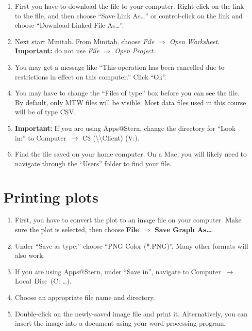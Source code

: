 \documentclass[11pt]{article}
\begin{document}
\begin{enumerate}

\item First you have to download the file to your computer.  
Right-click on the link to the file, and then choose ``Save Link As\ldots'' or
control-click on the link and choose ``Download Linked File As\ldots''.

\item Next start Minitab.  From Minitab, choose \textit{File $\Rightarrow$
  Open Worksheet}.  \textbf{Important:} do not use \textit{File $\Rightarrow$
  Open Project}.

\item You may get a message like ``This operation has been cancelled due to
  restrictions in effect on this computer.''  Click ``Ok''.

\item You may have to change the ``Files of type'' box before you can see the
file.  By default, only MTW files will be visible. Most data files used in this
course will be of type CSV.

\item \textbf{Important:} If you are using Apps@Stern, change the directory
  for ``Look in:'' to
  Computer~$\to$ C\$ (\textbackslash\textbackslash Client) (V:).  

\item Find the file saved on your home computer.
  On a Mac, you will likely need to navigate through the
  ``Users'' folder to find your file.

\end{enumerate}



\section*{Printing plots}

\begin{enumerate}

\item First, you have to convert the plot to an image file on your computer.
Make sure the plot is selected, then choose \textbf{File $\Rightarrow$ Save
Graph As\ldots}.

\item Under ``Save as type:'' choose ``PNG Color (*.PNG)''.  Many other
formats will also work.

\item If you are using Apps@Stern, under ``Save in'', navigate to 
Computer~$\to$ Local~Disc~(C: \ldots).

\item Choose an appropriate file name and directory.

\item Double-click on the newly-saved image file and print it.  Alternatively,
you can insert the image into a document using your word-processing program.

\end{enumerate}
\end{document}
